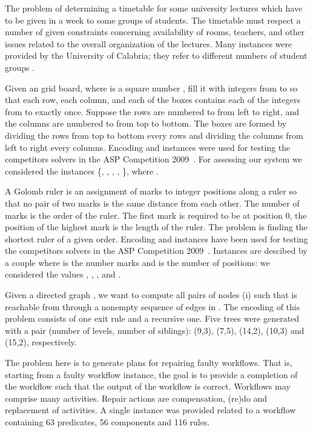 \documentclass[preprint]{tlp}
\begin{document}
The problem of determining a timetable for some
university lectures which have to be given in a week to some groups
of students. The timetable must respect a number of given
constraints concerning availability of rooms, teachers, and other
issues related to the overall organization of the lectures. Many
instances were provided by the University of Calabria; they refer
to different numbers of student groups .

Given an  grid board, where  is a square number ,
fill it with integers from  to  so that each row, each column,
and each of the   boxes contains each of the integers from  to  exactly once.
Suppose the rows are numbered  to  from left to right, and the columns are
numbered  to  from top to bottom. The boxes are formed by dividing the rows from
top to bottom every  rows and dividing the columns from left to right
every  columns. Encoding and instances were used for testing
the competitors solvers in the ASP Competition 2009~\cite{devebogetr09a}.
For assessing our system we considered the instances
\{, , , , \}, where
.

A Golomb ruler is an assignment of marks to integer positions along a ruler so
that no pair of two marks is the same distance from each other.
The number of marks is the order of the ruler. The first mark is required to be at position 0,
the position of the highest mark is the length of the ruler.
The problem is finding the shortest ruler of a given order.
Encoding and instances have been used for testing
the competitors solvers in the ASP Competition 2009~\cite{devebogetr09a}.
Instances are descibed by a couple  where   is the number marks
and  is the number of positions: we considered the values , ,
, and .

 Given a directed graph ,
we want to compute all pairs of nodes  (i)
such that  is reachable from  through a nonempty sequence of
edges in . The encoding of this problem consists of one exit rule
and a recursive one. Five trees were generated
with a pair (number of levels, number of siblings):
(9,3), (7,5), (14,2), (10,3) and (15,2), respectively.

The problem here is to generate plans for repairing faulty
workflows. That is, starting from a faulty workflow instance, the
goal is to provide a completion of the workflow such that the
output of the workflow is correct. Workflows may comprise many
activities. Repair actions are compensation, (re)do and
replacement of activities. A single instance was provided
related to a workflow containing 63 predicates,
56 components and 116 rules.
\end{document}
